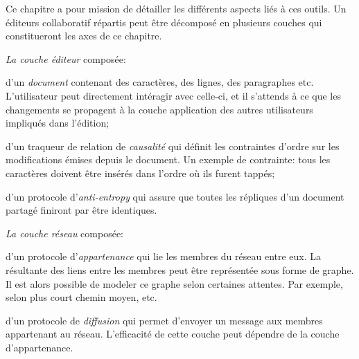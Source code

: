 Ce chapitre a pour mission de détailler les différents aspects liés à ces
outils. Un éditeurs collaboratif répartis peut être décomposé en plusieurs
couches qui constitueront les axes de ce chapitre.
\begin{inparaenum}[(1)]
\item \emph{La couche éditeur} composée:
  \begin{inparaenum}[(i)]
  \item d'un \emph{document} contenant des caractères, des lignes, des
    paragraphes etc. L'utilisateur peut directement intéragir avec celle-ci, et
    il s'attends à ce que les changements se propagent à la couche application
    des autres utilisateurs impliqués dans l'édition;
  \item d'un traqueur de relation de \emph{causalité} qui définit les
    contraintes d'ordre sur les modifications émises depuis le document. Un
    exemple de contrainte: tous les caractères doivent être insérés dans
    l'ordre où ils furent tappés;
  \item d'un protocole d'\emph{anti-entropy} qui assure que toutes les
    répliques d'un document partagé finiront par être identiques.
  \end{inparaenum}
\item \emph{La couche réseau} composée:
  \begin{inparaenum}[(i)]
  \item d'un protocole d'\emph{appartenance} qui lie les membres du réseau
    entre eux. La résultante des liens entre les membres peut être représentée
    sous forme de graphe. Il est alors possible de modeler ce graphe selon
    certaines attentes. Par exemple, selon plus court chemin moyen, etc.
  \item d'un protocole de \emph{diffusion} qui permet d'envoyer un message aux
    membres appartenant au réseau. L'efficacité de cette couche peut dépendre
    de la couche d'appartenance.
  \end{inparaenum}
\end{inparaenum}

